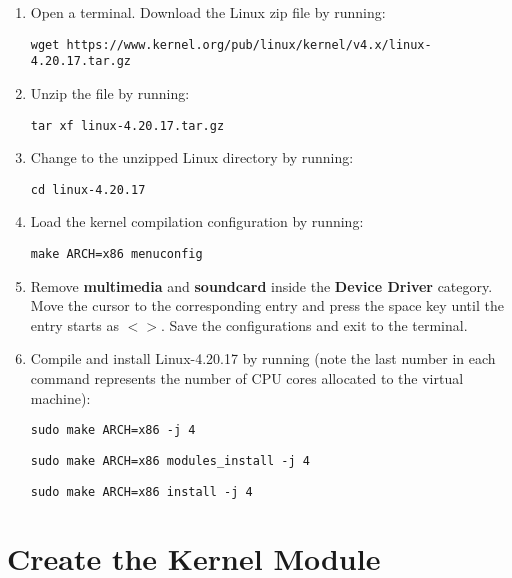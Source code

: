\documentclass[11pt,letterpaper,titlepage]{article}
\begin{document}
\begin{enumerate}
    
    \item Open a terminal. Download the Linux zip file by running:
    
    \texttt{wget https://www.kernel.org/pub/linux/kernel/v4.x/linux-4.20.17.tar.gz}
    
    \item Unzip the file by running:
    
    \texttt{tar xf linux-4.20.17.tar.gz}
    
    \item Change to the unzipped Linux directory by running:
    
    \texttt{cd linux-4.20.17}
    
    \item Load the kernel compilation configuration by running:
    
    \texttt{make ARCH=x86 menuconfig}
    
    \item Remove \textbf{multimedia} and \textbf{soundcard} inside the \textbf{Device Driver} category. Move the cursor to the corresponding entry and press the space key until the entry starts as $<>$. Save the configurations and exit to the terminal.
    
    \item Compile and install Linux-4.20.17 by running (note the last number in each command represents the number of CPU cores allocated to the virtual machine):
    
    \texttt{sudo make ARCH=x86 -j 4}
    
    \texttt{sudo make ARCH=x86 modules\_install -j 4}
    
    \texttt{sudo make ARCH=x86 install -j 4}
    
\end{enumerate}

\section{Create the Kernel Module}
\end{document}
